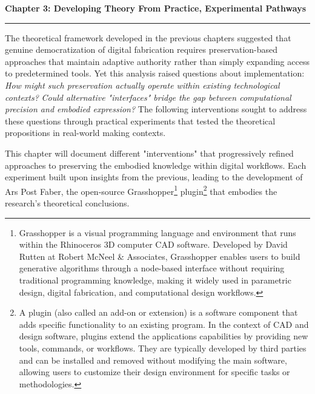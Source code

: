 \clearpage

\setcounter{chapter}{3}
\setcounter{section}{0}


\pagestyle{fancy}
\fancyhf{} %
\fancyfoot[C]{\thepage} %
\renewcommand{\headrulewidth}{0pt}
\renewcommand{\footrulewidth}{0pt}


\noindent
{\Large\textbf{Chapter 3: Developing Theory From Practice, Experimental Pathways}}
\vspace{0.3cm}
\hrule
\vspace{0.8cm}
\label{ch:experimental_pathways}

\setlength{\parindent}{0pt}
The theoretical framework developed in the previous chapters suggested that genuine democratization of digital fabrication requires preservation-based approaches that maintain adaptive authority rather than simply expanding access to predetermined tools. Yet this analysis raised questions about implementation: \textit{How might such preservation actually operate within existing technological contexts?} \textit{Could alternative "interfaces" bridge the gap between computational precision and embodied expression?} The following interventions sought to address these questions through practical experiments that tested the theoretical propositions in real-world making contexts.

\vspace{0.5cm}

This chapter will document different "interventions" that progressively refined approaches to preserving the embodied knowledge within digital workflows. Each experiment built upon insights from the previous, leading to the development of Ars Post Faber, the open-source Grasshopper\footnote{Grasshopper is a visual programming language and environment that runs within the Rhinoceros 3D computer CAD software. Developed by David Rutten at Robert McNeel \& Associates, Grasshopper enables users to build generative algorithms through a node-based interface without requiring traditional programming knowledge, making it widely used in parametric design, digital fabrication, and computational design workflows.} plugin\footnote{A plugin (also called an add-on or extension) is a software component that adds specific functionality to an existing program. In the context of CAD and design software, plugins extend the applications capabilities by providing new tools, commands, or workflows. They are typically developed by third parties and can be installed and removed without modifying the main software, allowing users to customize their design environment for specific tasks or methodologies.} that embodies the research's theoretical conclusions.

